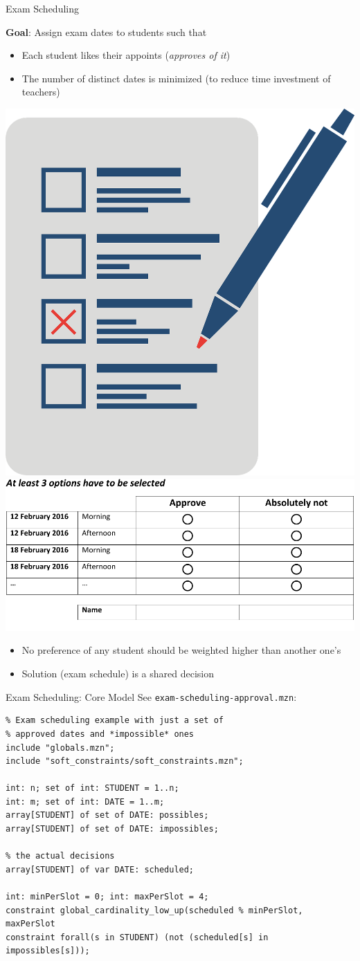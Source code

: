 \documentclass[handout,10pt,xcolor={dvipsnames},fleqn]{beamer}
\begin{document}
\begin{frame}[fragile]{Exam Scheduling}

\textbf{Goal}: Assign exam dates to students such that 
\begin{itemize}
\item Each student likes their appoints (\emph{approves of it})
\item The number of distinct dates is minimized (to reduce time investment of teachers)
\end{itemize}

\begin{center}
\includegraphics[width=.15\textwidth]{img/voting.png}
\hspace*{4ex}
\includegraphics[width=.5\textwidth]{img/Voting.pdf}
\end{center}

\begin{itemize}
\item No preference of any student should be weighted higher than another one's
\item Solution (exam schedule) is a shared decision

\end{itemize}
\end{frame}

\begin{frame}[fragile]{Exam Scheduling: Core Model}
See \texttt{exam-scheduling-approval.mzn}:
\begin{lstlisting}
% Exam scheduling example with just a set of 
% approved dates and *impossible* ones
include "globals.mzn";
include "soft_constraints/soft_constraints.mzn";

int: n; set of int: STUDENT = 1..n; 
int: m; set of int: DATE = 1..m;
array[STUDENT] of set of DATE: possibles;
array[STUDENT] of set of DATE: impossibles;

% the actual decisions
array[STUDENT] of var DATE: scheduled;

int: minPerSlot = 0; int: maxPerSlot = 4;
constraint global_cardinality_low_up(scheduled % minPerSlot, maxPerSlot
constraint forall(s in STUDENT) (not (scheduled[s] in impossibles[s])); 
 
\end{lstlisting}
\end{frame}
\end{document}
